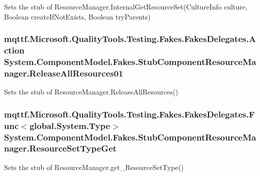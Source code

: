 Sets the stub of Resource\-Manager.\-Internal\-Get\-Resource\-Set(\-Culture\-Info culture, Boolean create\-If\-Not\-Exists, Boolean try\-Parents)

\hypertarget{class_system_1_1_component_model_1_1_fakes_1_1_stub_component_resource_manager_a02a306860f377ec43fb6f35fd39791a9}{
\subsubsection[{Release\-All\-Resources01}]{\setlength{\rightskip}{0pt plus 5cm}mqttf.\-Microsoft.\-Quality\-Tools.\-Testing.\-Fakes.\-Fakes\-Delegates.\-Action System.\-Component\-Model.\-Fakes.\-Stub\-Component\-Resource\-Manager.\-Release\-All\-Resources01}}\label{class_system_1_1_component_model_1_1_fakes_1_1_stub_component_resource_manager_a02a306860f377ec43fb6f35fd39791a9}


Sets the stub of Resource\-Manager.\-Release\-All\-Resources()

\hypertarget{class_system_1_1_component_model_1_1_fakes_1_1_stub_component_resource_manager_a7a5b7c1e37da2404c3fa7eea480d49af}{
\subsubsection[{Resource\-Set\-Type\-Get}]{\setlength{\rightskip}{0pt plus 5cm}mqttf.\-Microsoft.\-Quality\-Tools.\-Testing.\-Fakes.\-Fakes\-Delegates.\-Func$<$global.\-System.\-Type$>$ System.\-Component\-Model.\-Fakes.\-Stub\-Component\-Resource\-Manager.\-Resource\-Set\-Type\-Get}}\label{class_system_1_1_component_model_1_1_fakes_1_1_stub_component_resource_manager_a7a5b7c1e37da2404c3fa7eea480d49af}


Sets the stub of Resource\-Manager.\-get\-\_\-\-Resource\-Set\-Type()



